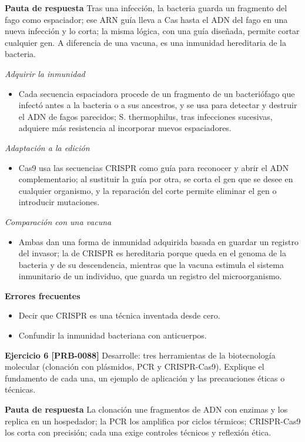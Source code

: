 \documentclass{book}
\begin{document}
\noindent\textbf{Pauta de respuesta}
Tras una infección, la bacteria guarda un fragmento del fago como espaciador; ese ARN guía lleva a Cas hasta el ADN del fago en una nueva infección y lo corta; la misma lógica, con una guía diseñada, permite cortar cualquier gen. A diferencia de una vacuna, es una inmunidad hereditaria de la bacteria.


\noindent\textit{Adquirir la inmunidad}
\begin{itemize}
\item Cada secuencia espaciadora procede de un fragmento de un bacteriófago que infectó antes a la bacteria o a sus ancestros, y se usa para detectar y destruir el ADN de fagos parecidos; S. thermophilus, tras infecciones sucesivas, adquiere más resistencia al incorporar nuevos espaciadores.
\end{itemize}

\noindent\textit{Adaptación a la edición}
\begin{itemize}
\item Cas9 usa las secuencias CRISPR como guía para reconocer y abrir el ADN complementario; al sustituir la guía por otra, se corta el gen que se desee en cualquier organismo, y la reparación del corte permite eliminar el gen o introducir mutaciones.
\end{itemize}

\noindent\textit{Comparación con una vacuna}
\begin{itemize}
\item Ambas dan una forma de inmunidad adquirida basada en guardar un registro del invasor; la de CRISPR es hereditaria porque queda en el genoma de la bacteria y de su descendencia, mientras que la vacuna estimula el sistema inmunitario de un individuo, que guarda un registro del microorganismo.
\end{itemize}

\noindent\textbf{Errores frecuentes}
\begin{itemize}
\item Decir que CRISPR es una técnica inventada desde cero.
\item Confundir la inmunidad bacteriana con anticuerpos.
\end{itemize}

\noindent\textbf{Ejercicio 6 [PRB-0088]}
Desarrolle: tres herramientas de la biotecnología molecular (clonación con plásmidos, PCR y CRISPR-Cas9). Explique el fundamento de cada una, un ejemplo de aplicación y las precauciones éticas o técnicas.


\noindent\textbf{Pauta de respuesta}
La clonación une fragmentos de ADN con enzimas y los replica en un hospedador; la PCR los amplifica por ciclos térmicos; CRISPR-Cas9 los corta con precisión; cada una exige controles técnicos y reflexión ética.
\end{document}
